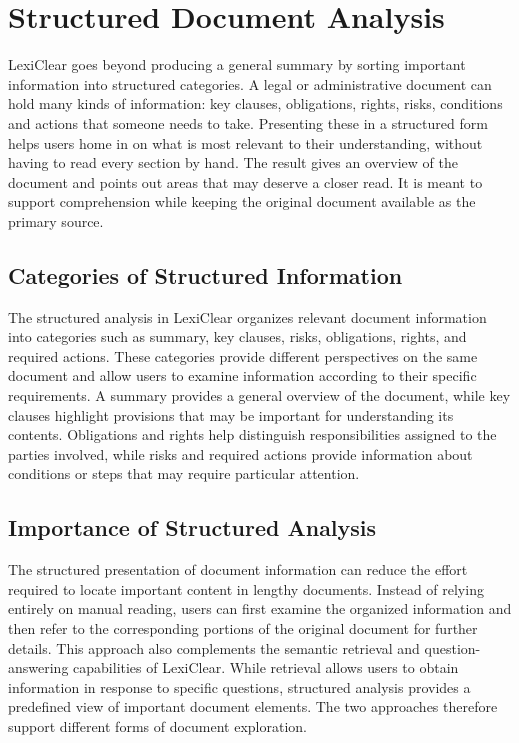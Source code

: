 \documentclass[12pt,a4paper,oneside]{report}
\begin{document}
\section{Structured Document Analysis}

LexiClear goes beyond producing a general summary by sorting important information into structured categories. A legal or administrative document can hold many kinds of information: key clauses, obligations, rights, risks, conditions and actions that someone needs to take. Presenting these in a structured form helps users home in on what is most relevant to their understanding, without having to read every section by hand. The result gives an overview of the document and points out areas that may deserve a closer read. It is meant to support comprehension while keeping the original document available as the primary source.

\subsection{Categories of Structured Information}

The structured analysis in LexiClear organizes relevant document information
into categories such as summary, key clauses, risks, obligations, rights, and
required actions. These categories provide different perspectives on the
same document and allow users to examine information according to their
specific requirements. A summary provides a general overview of the document, while key clauses
highlight provisions that may be important for understanding its contents.
Obligations and rights help distinguish responsibilities assigned to the
parties involved, while risks and required actions provide information about
conditions or steps that may require particular attention.

\subsection{Importance of Structured Analysis}

The structured presentation of document information can reduce the effort
required to locate important content in lengthy documents. Instead of relying
entirely on manual reading, users can first examine the organized information
and then refer to the corresponding portions of the original document for
further details. This approach also complements the semantic retrieval and question-answering
capabilities of LexiClear. While retrieval allows users to obtain information
in response to specific questions, structured analysis provides a predefined
view of important document elements. The two approaches therefore support
different forms of document exploration.
\end{document}
